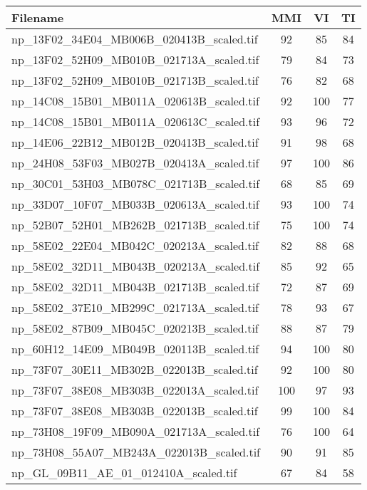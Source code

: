 \begin{tabular}{lccc}
\hline
 ﻿Filename                                & MMI   & VI    & TI    \\ \hline \hline
 np\_13F02\_34E04\_MB006B\_020413B\_scaled.tif & 92    & 85    & 84    \\
 np\_13F02\_52H09\_MB010B\_021713A\_scaled.tif & 79    & 84    & 73    \\
 np\_13F02\_52H09\_MB010B\_021713B\_scaled.tif & 76    & 82    & 68    \\
 np\_14C08\_15B01\_MB011A\_020613B\_scaled.tif & 92    & 100   & 77    \\
 np\_14C08\_15B01\_MB011A\_020613C\_scaled.tif & 93    & 96    & 72    \\
 np\_14E06\_22B12\_MB012B\_020413B\_scaled.tif & 91    & 98    & 68    \\
 np\_24H08\_53F03\_MB027B\_020413A\_scaled.tif & 97    & 100   & 86    \\
 np\_30C01\_53H03\_MB078C\_021713B\_scaled.tif & 68    & 85    & 69    \\
 np\_33D07\_10F07\_MB033B\_020613A\_scaled.tif & 93    & 100   & 74    \\
 np\_52B07\_52H01\_MB262B\_021713B\_scaled.tif & 75    & 100   & 74    \\
 np\_58E02\_22E04\_MB042C\_020213A\_scaled.tif & 82    & 88    & 68    \\
 np\_58E02\_32D11\_MB043B\_020213A\_scaled.tif & 85    & 92    & 65    \\
 np\_58E02\_32D11\_MB043B\_021713B\_scaled.tif & 72    & 87    & 69    \\
 np\_58E02\_37E10\_MB299C\_021713A\_scaled.tif & 78    & 93    & 67    \\
 np\_58E02\_87B09\_MB045C\_020213B\_scaled.tif & 88    & 87    & 79    \\
 np\_60H12\_14E09\_MB049B\_020113B\_scaled.tif & 94    & 100   & 80    \\
 np\_73F07\_30E11\_MB302B\_022013B\_scaled.tif & 92    & 100   & 80    \\
 np\_73F07\_38E08\_MB303B\_022013A\_scaled.tif & 100   & 97    & 93    \\
 np\_73F07\_38E08\_MB303B\_022013B\_scaled.tif & 99    & 100   & 84    \\
 np\_73H08\_19F09\_MB090A\_021713A\_scaled.tif & 76    & 100   & 64    \\
 np\_73H08\_55A07\_MB243A\_022013B\_scaled.tif & 90    & 91    & 85    \\
 np\_GL\_09B11\_AE\_01\_012410A\_scaled.tif     & 67    & 84    & 58    \\

\end{tabular}
